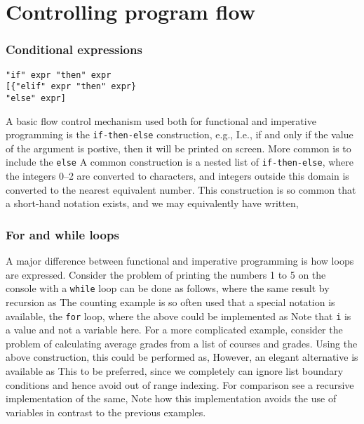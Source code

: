 \chapter{Controlling program flow}
\label{chap:flow}
\subsection{Conditional expressions}
\begin{lstlisting}[language=EBNF]
"if" expr "then" expr 
[{"elif" expr "then" expr}
"else" expr]
\end{lstlisting}
A basic flow control mechanism used both for functional and imperative programming is the \texttt{if-then-else} construction, e.g.,
I.e., if and only if the value of the argument is postive, then it will be printed on screen. More common is to include the \texttt{else} 
A common construction is a nested list of \texttt{if-then-else},
where the integers 0--2 are converted to characters, and integers outside this domain is converted to the nearest equivalent number. This construction is so common that a short-hand notation exists, and we may equivalently have written,

\subsection{For and while loops}
A major difference between functional and imperative programming is how loops are expressed. Consider the problem of printing the numbers 1 to 5 on the console with a \texttt{while} loop can be done as follows,
where the same result by recursion as
The counting example is so often used that a special notation is available, the \texttt{for} loop, where the above could be implemented as
Note that \texttt{i} is a value and not a variable here. For a more complicated example, consider the problem of calculating average grades from a list of courses and grades. Using the above construction, this could be performed as,
However, an elegant alternative is available as
This to be preferred, since we completely can ignore list boundary conditions and hence avoid out of range indexing. For comparison see a recursive implementation of the same,
Note how this implementation avoids the use of variables in contrast to the previous examples.


